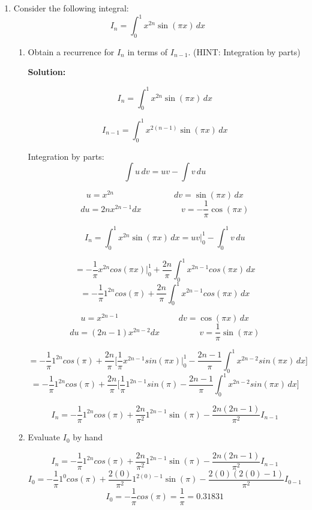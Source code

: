 \documentclass{article}
\begin{document}
\begin{enumerate}
\pagebreak

\item Consider the following integral:
    $$I_{n} = \int_{0}^{1} x^{2n} \sin(\pi x) \,  dx$$

\begin{enumerate}
\item Obtain a recurrence for $I_{n}$ in terms of $I_{n-1}$. (HINT: Integration by parts)

\textbf{Solution:}

$$I_{n} = \int_{0}^{1} x^{2n} \sin(\pi x) \, dx$$

$$I_{n-1} = \int_{0}^{1} x^{2(n-1)} \sin(\pi x) \, dx$$

Integration by parts: 
    $$\int u \, dv = uv - \int v \, du$$

        $$u = x^{2n} \hspace{3cm}  dv = \sin(\pi x) \, dx$$
        $$du = 2nx^{2n-1} dx \hspace{2cm} v = -\frac{1}{\pi} \cos(\pi x)$$


        $$I_{n} = \int_{0}^{1} x^{2n} \sin(\pi x) \,  dx = uv \bigg\rvert_{0}^{1} - \int_{0}^{1} v \, du$$

        $$= - \frac{1}{\pi} x^{2n} cos(\pi x) \bigg\rvert_{0}^{1} + \frac{2n}{\pi} \int_{0}^{1} x^{2n-1} cos(\pi x) \, dx$$
        $$= - \frac{1}{\pi} 1^{2n} cos(\pi) + \frac{2n}{\pi} \int_{0}^{1} x^{2n-1} cos(\pi x) \, dx$$

        $$u = x^{2n-1} \hspace{3cm}  dv = \cos(\pi x) \, dx$$
        $$du = (2n-1)x^{2n-2} dx \hspace{2cm} v = \frac{1}{\pi} \sin(\pi x)$$

        $$= - \frac{1}{\pi} 1^{2n} cos(\pi) + \frac{2n}{\pi} \bigg[ \frac{1}{\pi} x^{2n-1} sin(\pi x) \bigg\rvert_{0}^{1} - \frac{2n-1}{\pi} \int_{0}^{1} x^{2n-2} sin(\pi x) \, dx \bigg]$$
        $$= - \frac{1}{\pi} 1^{2n} cos(\pi) + \frac{2n}{\pi} \bigg[ \frac{1}{\pi} 1^{2n-1} sin(\pi) - \frac{2n-1}{\pi} \int_{0}^{1} x^{2n-2} sin(\pi x) \, dx \bigg]$$

        $$I_{n} = - \frac{1}{\pi} 1^{2n} cos(\pi) + \frac{2n}{\pi^{2}} 1^{2n-1} \sin(\pi) - \frac{2n(2n-1)}{\pi^{2}} I_{n-1}$$

        \vspace{2cm}

\item Evaluate $I_{0}$ by hand

        $$I_{n} = - \frac{1}{\pi} 1^{2n} cos(\pi) + \frac{2n}{\pi^{2}} 1^{2n-1} \sin(\pi) - \frac{2n(2n-1)}{\pi^{2}} I_{n-1}$$
        $$I_{0} = - \frac{1}{\pi} 1^{0} cos(\pi) + \frac{2(0)}{\pi^{2}} 1^{2(0)-1} \sin(\pi) - \frac{2(0)(2(0)-1)}{\pi^{2}} I_{0-1}$$
        $$I_{0} = - \frac{1}{\pi} cos(\pi) = \frac{1}{\pi} = 0.31831$$


\end{enumerate}
\end{enumerate}
\end{document}
